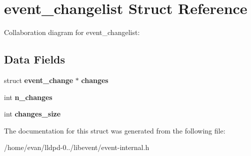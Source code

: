 \section{event\-\_\-changelist \-Struct \-Reference}
\label{structevent__changelist}


\-Collaboration diagram for event\-\_\-changelist\-:
\subsection*{\-Data \-Fields}
\begin{DoxyCompactItemize}
\item 
struct {\bf event\-\_\-change} $\ast$ {\bfseries changes}\label{structevent__changelist_a58fbb0fa6ec7b40e58fc4d60a4ab1072}

\item 
int {\bfseries n\-\_\-changes}\label{structevent__changelist_a8dcbe8872d3e679e08e4338c851b2c80}

\item 
int {\bfseries changes\-\_\-size}\label{structevent__changelist_a93791bd5546d31e77878190a7ad3c3ce}

\end{DoxyCompactItemize}


\-The documentation for this struct was generated from the following file\-:\begin{DoxyCompactItemize}
\item 
/home/evan/lldpd-\/0../libevent/event-\/internal.\-h\end{DoxyCompactItemize}
